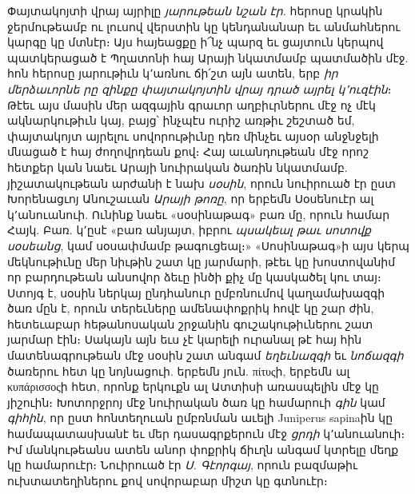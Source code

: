 \documentclass{article}
\begin{document}
{Փայտակոյտի վրայ այրիլը \emph{յարութեան նշան էր.} հերոսը կրակին ջերմութեամբ ու լուսով վերստին կը կենդանանար եւ անմահներու կարգը կը մտնէր։ Այս հայեացքը ի՜նչ պարզ եւ ցայտուն կերպով պատկերացած է Պղատոնի հայ Արայի նկատմամբ պատմածին մէջ. հոն հերոսը յարութիւն կ՚առնու ճի՛շտ այն ատեն, երբ \emph{իր մերձաւորնե րը զինքը փայտակոյտին վրայ դրած այրել կ՚ուզէին}։ Թէեւ այս մասին մեր ազգային գրաւոր աղբիւրներու մէջ ոչ մէկ ակնարկութիւն կայ, բայց՝ ինչպէս ուրիշ առթիւ շեշտած եմ, փայտակոյտ այրելու սովորութիւնը դեռ մինչեւ այսօր անջնջելի մնացած է հայ ժողովրդեան քով։ Հայ աւանդութեան մէջ որոշ հետքեր կան նաեւ Արայի նուիրական ծառին նկատմամբ. յիշատակութեան արժանի է նախ \emph{սօսին}, որուն նուիրուած էր ըստ Խորենացւոյ Անուշաւան \emph{Արայի թոռը}, որ երբեմն Սօսենուէր ալ կ՚անուանուի. Ունինք նաեւ «սօսինաթագ» բառ մը, որուն համար Հայկ. Բառ. կ՚ըսէ «բառ անյայտ, իբրու \emph{պսակեալ թաւ սոտովք սօսեանց}, կամ սօսափմամբ թագուցեալ։» «Սոսինաթագ»ի այս կերպ մեկնութիւնը մեր նիւթին շատ կը յարմարի, թէեւ կը խոստովանիմ որ բարդութեան անսովոր ձեւը ինծի քիչ մը կասկածել կու տայ։ Ստոյգ է, սօսին ներկայ ընդհանուր ըմբռնումով կաղամախազգի ծառ մըն է, որուն տերեւները ամենափոքրիկ հովէ կը շար ժին, հետեւաբար հեթանոսական շրջանին գուշակութիւներու շատ յարմար էին։ Սակայն այն եւս չէ կարելի ուրանալ թէ հայ հին մատենագրութեան մէջ սօսին շատ անգամ \emph{եղեւնազգի} եւ \emph{նոճազգի} ծառերու հետ կը նոյնացուի. երբեմն յուն. πίτυςի, երբեմն ալ κυπάρισσοςի հետ, որոնք երկուքն ալ Ատտիսի առասպելին մէջ կը յիշուին։ Խոտորջրոյ մէջ նուիրական ծառ կը համարուի \emph{գին} կամ \emph{գիհին}, որ ըստ հոնտեղուան ըմբռնման աւելի Juniperus sapinaին կը համապատասխանէ եւ մեր դասագրքերուն մէջ \emph{ցրդի} կ՚անուանուի։ Իմ մանկութեանս ատեն անոր փոքրիկ ճիւղն անգամ կտրելը մեղք կը համարուէր։ Նուիրուած էր \emph{Ս. Գէորգայ}, որուն բազմաթիւ ուխտատեղիներու քով սովորաբար միշտ կը գտնուէր։

}
\end{document}
